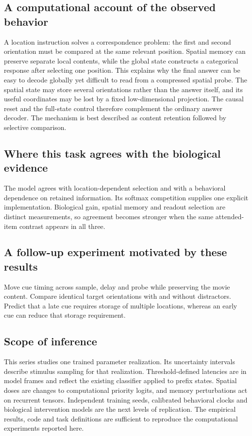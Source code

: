 \documentclass[11pt]{article}
\begin{document}
\subsection{A computational account of the observed behavior}
A location instruction solves a correspondence problem: the first and second orientation must be compared at the same relevant position. Spatial memory can preserve separate local contents, while the global state constructs a categorical response after selecting one position. This explains why the final answer can be easy to decode globally yet difficult to read from a compressed spatial probe. The spatial state may store several orientations rather than the answer itself, and its useful coordinates may be lost by a fixed low-dimensional projection. The causal reset and the full-state control therefore complement the ordinary answer decoder. The mechanism is best described as content retention followed by selective comparison.

\subsection{Where this task agrees with the biological evidence}
The model agrees with location-dependent selection and with a behavioral dependence on retained information. Its softmax competition supplies one explicit implementation. Biological gain, spatial memory and readout selection are distinct measurements, so agreement becomes stronger when the same attended-item contrast appears in all three.

\subsection{A follow-up experiment motivated by these results}
Move cue timing across sample, delay and probe while preserving the movie content. Compare identical target orientations with and without distractors. Predict that a late cue requires storage of multiple locations, whereas an early cue can reduce that storage requirement.
\subsection{Scope of inference}
This series studies one trained parameter realization. Its uncertainty intervals describe stimulus sampling for that realization. Threshold-defined latencies are in model frames and reflect the existing classifier applied to prefix states. Spatial doses are changes to computational priority logits, and memory perturbations act on recurrent tensors. Independent training seeds, calibrated behavioral clocks and biological intervention models are the next levels of replication. The empirical results, code and task definitions are sufficient to reproduce the computational experiments reported here.
\end{document}
